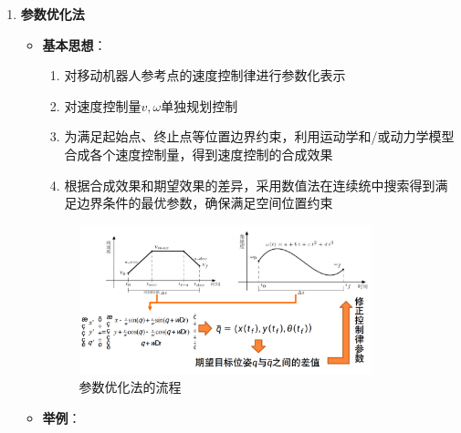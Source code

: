 \documentclass[../main.tex]{subfiles}
\begin{document}
\begin{enumerate}
\begin{itemize}
\begin{enumerate}
\begin{itemize}
                            \\\small{}
                        \end{itemize}
                    \end{enumerate}
                \end{itemize}
                    \item \textbf{参数优化法}\label{method:opt}
                        \begin{itemize}
                            \item \textbf{基本思想}：
                                \begin{enumerate}
                                    \item 对移动机器人参考点的速度控制律进行参数化表示
                                    \item 对速度控制量$v,\omega$单独规划控制
                                    \item 为满足起始点、终止点等位置边界约束，利用运动学和/或动力学模型合成各个速度控制量，得到速度控制的合成效果
                                    \item 根据合成效果和期望效果的差异，采用数值法在连续统中搜索得到满足边界条件的最优参数，确保满足空间位置约束
                                \end{enumerate}
                            \begin{figure}[H]
                                \centering
                                \includegraphics[width=0.85\textwidth]{images/canshuyouhuafa.png}
                                \caption{参数优化法的流程}
                            \end{figure} 
                            \item  \textbf{举例}：
                            \small\kaishu{
}
\end{itemize}
\end{enumerate}
\end{document}
